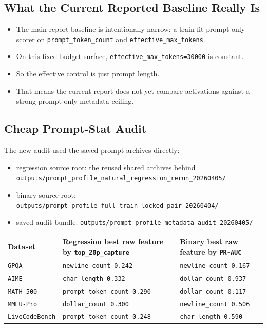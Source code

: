 \documentclass[11pt]{article}
\begin{document}
\subsection*{What the Current Reported Baseline Really Is}
\begin{itemize}[leftmargin=1.5em]
\item The main report baseline is intentionally narrow: a train-fit prompt-only scorer on \texttt{prompt\_token\_count} and \texttt{effective\_max\_tokens}.
\item On this fixed-budget surface, \texttt{effective\_max\_tokens=30000} is constant.
\item So the effective control is just prompt length.
\item That means the current report does not yet compare activations against a strong prompt-only metadata ceiling.
\end{itemize}

\subsection*{Cheap Prompt-Stat Audit}
The new audit used the saved prompt archives directly:
\begin{itemize}[leftmargin=1.5em]
\item regression source root: the reused shared archives behind
  \texttt{outputs/prompt\_profile\_natural\_regression\_rerun\_20260405/}
\item binary source root:
  \texttt{outputs/prompt\_profile\_full\_train\_locked\_pair\_20260404/}
\item saved audit bundle:
  \texttt{outputs/prompt\_profile\_metadata\_audit\_20260405/}
\end{itemize}

\begin{center}
\small
\begin{tabular}{@{}>{\raggedright\arraybackslash}p{1.6in}>{\raggedright\arraybackslash}p{2.1in}>{\raggedright\arraybackslash}p{2.1in}@{}}
\toprule
Dataset & Regression best raw feature by \texttt{top\_20p\_capture} & Binary best raw feature by \texttt{PR-AUC} \\
\midrule
\texttt{GPQA} & \texttt{newline\_count 0.242} & \texttt{newline\_count 0.167} \\
\texttt{AIME} & \texttt{char\_length 0.332} & \texttt{dollar\_count 0.937} \\
\texttt{MATH-500} & \texttt{prompt\_token\_count 0.290} & \texttt{dollar\_count 0.117} \\
\texttt{MMLU-Pro} & \texttt{dollar\_count 0.300} & \texttt{newline\_count 0.506} \\
\texttt{LiveCodeBench} & \texttt{prompt\_token\_count 0.248} & \texttt{char\_length 0.590} \\
\bottomrule
\end{tabular}
\end{center}
\end{document}

